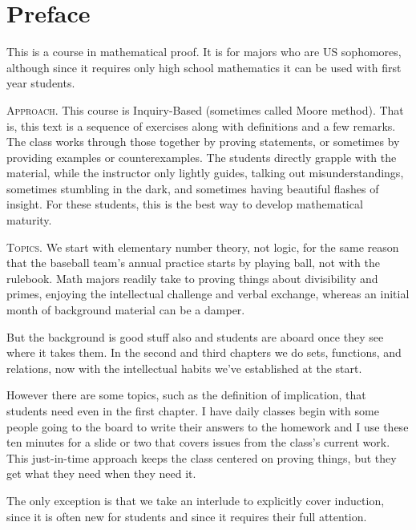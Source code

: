 \documentclass{ibl}
\begin{document}
\chapter*{Preface}

This is a course in mathematical proof. 
It is for majors who are US sophomores, although since
it requires only high school mathematics
it can be used with first year students.



\medskip
\noindent\textsc{Approach.}
This course is Inquiry-Based (sometimes called Moore method).
That is, this text is a sequence of exercises
along with definitions and a few 
remarks.
The class works through those together by
proving statements, or sometimes by providing examples or counterexamples.
The students directly grapple with the material, 
while the instructor only lightly guides, 
talking out misunderstandings, 
sometimes stumbling in the dark, and sometimes
having beautiful flashes of insight.
For these students, 
this is the best way to develop mathematical maturity.


\medskip
\noindent\textsc{Topics.}
We start with elementary number theory, not logic, 
for the same reason
that the baseball team's annual practice starts by playing ball, 
not with the rulebook.
Math majors readily take to proving things about
divisibility and primes, enjoying the 
intellectual challenge and verbal exchange, 
whereas an initial month of background material can be a damper.

But the background is good stuff also and 
students are aboard once they see where it takes them.
In the second and third chapters we do
sets, functions, and relations, now with the
intellectual habits we've established at the start.

However there are some topics, such as the definition of implication, 
that students need even in the
first chapter.
I have daily classes begin with some people going to the 
board to write their answers to the homework and 
I use these ten minutes for a slide or two that covers issues from
the class's current work.
This just-in-time approach keeps the class centered 
on proving things, but they get what
they need when they need it.

The only exception is that we take an interlude to explicitly cover induction,
since it is often new for students and since it requires 
their full attention.
\end{document}
